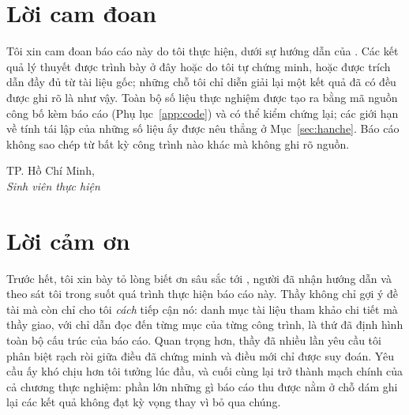 
\chapter*{Lời cam đoan}

Tôi xin cam đoan báo cáo này do tôi thực hiện, dưới sự hướng dẫn của
\thesisAdvisor. Các kết quả lý thuyết được trình bày ở đây hoặc do tôi tự chứng
minh, hoặc được trích dẫn đầy đủ từ tài liệu gốc; những chỗ tôi chỉ diễn giải
lại một kết quả đã có đều được ghi rõ là như vậy. Toàn bộ số liệu thực nghiệm
được tạo ra bằng mã nguồn công bố kèm báo cáo (Phụ lục~\ref{app:code}) và có thể
kiểm chứng lại; các giới hạn về tính tái lập của những số liệu ấy được nêu thẳng
ở Mục~\ref{sec:hanche}. Báo cáo không sao chép từ bất kỳ công trình nào khác mà
không ghi rõ nguồn.

\vspace{1.5cm}
\begin{flushright}
\begin{minipage}{8.6cm}
\centering
TP. Hồ Chí Minh, \thesisDate\\[0.3cm]
\textit{Sinh viên thực hiện}\\[2cm]
\thesisAuthor
\end{minipage}
\end{flushright}

\chapter*{Lời cảm ơn}

Trước hết, tôi xin bày tỏ lòng biết ơn sâu sắc tới \thesisAdvisor{}, người đã
nhận hướng dẫn và theo sát tôi trong suốt quá trình thực hiện báo cáo này. Thầy
không chỉ gợi ý đề tài mà còn chỉ cho tôi \emph{cách} tiếp cận nó: danh mục tài
liệu tham khảo chi tiết mà thầy giao, với chỉ dẫn đọc đến từng mục của từng công
trình, là thứ đã định hình toàn bộ cấu trúc của báo cáo. Quan trọng hơn, thầy
đã nhiều lần yêu cầu tôi phân biệt rạch ròi giữa điều đã chứng minh và điều mới
chỉ được suy đoán. Yêu cầu ấy khó chịu hơn tôi tưởng lúc đầu, và cuối cùng lại
trở thành mạch chính của cả chương thực nghiệm: phần lớn những gì báo cáo thu
được nằm ở chỗ dám ghi lại các kết quả không đạt kỳ vọng thay vì bỏ qua chúng.

